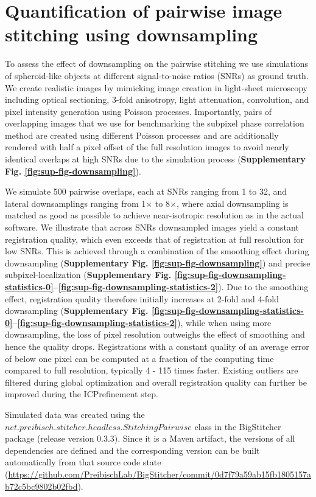 \section{Quantification of pairwise image stitching using downsampling}
\label{sec:quantPCM}

To assess the effect of downsampling on the pairwise stitching we use simulations of spheroid-like objects at different signal-to-noise ratios (SNRs) as ground truth. We create realistic images by mimicking image creation in light-sheet microscopy including optical sectioning, 3-fold anisotropy, light attenuation, convolution, and pixel intensity generation using Poisson processes\cite{mvdecon}. Importantly, pairs of overlapping images that we use for benchmarking the subpixel phase correlation method are created using different Poisson processes and are additionally rendered with half a pixel offset of the full resolution images to avoid nearly identical overlaps at high SNRs due to the simulation process (\textbf{Supplementary Fig. \ref{fig:sup-fig-downsampling}}).

We simulate 500 pairwise overlaps, each at SNRs ranging from 1 to 32, and lateral downsamplings ranging from 1$\times$ to 8$\times$, where axial downsampling is matched as good as possible to achieve near-isotropic resolution as in the actual software. We illustrate that across SNRs downsampled images yield a constant registration quality, which even exceeds that of registration at full resolution for low SNRs. This is achieved through a combination of the smoothing effect during downsampling (\textbf{Supplementary Fig. \ref{fig:sup-fig-downsampling}}) and precise subpixel-localization (\textbf{Supplementary Fig. \ref{fig:sup-fig-downsampling-statistics-0}--\ref{fig:sup-fig-downsampling-statistics-2}}). Due to the smoothing effect, registration quality therefore initially increases at 2-fold and 4-fold downsampling (\textbf{Supplementary Fig. \ref{fig:sup-fig-downsampling-statistics-0}--\ref{fig:sup-fig-downsampling-statistics-2}}), while when using more downsampling, the loss of pixel resolution outweighs the effect of smoothing and hence the quality drops. Registrations with a constant quality of an average error of below one pixel can be computed at a fraction of the computing time compared to full resolution, typically 4 - 115 times faster. Existing outliers are filtered during global optimization and overall registration quality can further be improved during the ICP\cite{icp }refinement step.

Simulated data was created using the $net.preibisch.stitcher.headless.StitchingPairwise$ class in the BigStitcher package (release version 0.3.3). Since it is a Maven artifact, the versions of all dependencies are defined and the corresponding version can be built automatically from that source code state \small(\url{https://github.com/PreibischLab/BigStitcher/commit/0d7f79a59ab15fb1805157ab72c5bc9802b02fbd}).


